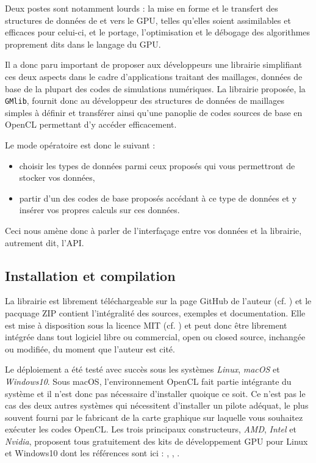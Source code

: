 \documentclass[a4paper,12pt]{article}
\begin{document}
Deux postes sont notamment lourds : la mise en forme et le transfert des structures de données de et vers le GPU, telles qu'elles soient assimilables et efficaces pour celui-ci, et le portage, l'optimisation et le débogage des algorithmes proprement dits dans le langage du GPU.

Il a donc paru important de proposer aux développeurs une librairie simplifiant ces deux aspects dans le cadre d'applications traitant des maillages, données de base de la plupart des codes de simulations numériques. La librairie proposée, la {\tt GMlib}, fournit donc au développeur des structures de données de maillages simples à définir et transférer ainsi qu'une panoplie de codes sources de base en OpenCL permettant d'y accéder efficacement.

Le mode opératoire est donc le suivant :

\begin{itemize}
\item choisir les types de données parmi ceux proposés qui vous permettront de stocker vos données,
\item partir d'un des codes de base proposés accédant à ce type de données et y insérer vos propres calculs sur ces données.
\end{itemize}

Ceci nous amène donc à parler de l'interfaçage entre vos données et la librairie, autrement dit, l'API.

\subsection{Installation et compilation}

La librairie est librement téléchargeable sur la page GitHub de l'auteur (cf. \cite{gmlib}) et le pacquage ZIP contient l'intégralité des sources, exemples et documentation.
Elle est mise à disposition sous la licence MIT (cf. \cite{MIT}) et peut donc être librement intégrée dans tout logiciel libre ou commercial, open ou closed source, inchangée ou modifiée, du moment que l'auteur est cité.

Le déploiement a été testé avec succès sous les systèmes \emph{Linux}, \emph{macOS} et \emph{Windows10}.
Sous macOS, l'environnement OpenCL fait partie intégrante du système et il n'est donc pas nécessaire d'installer quoique ce soit.
Ce n'est pas le cas des deux autres systèmes qui nécessitent d'installer un pilote adéquat, le plus souvent fourni par le fabricant de la carte graphique sur laquelle vous souhaitez exécuter les codes OpenCL.
Les trois principaux constructeurs, \emph{AMD}, \emph{Intel} et \emph{Nvidia}, proposent tous gratuitement des kits de développement GPU pour Linux et Windows10 dont les références sont ici : \cite{driver_amd}, \cite{driver_intel}, \cite{driver_nvidia}.
\end{document}
